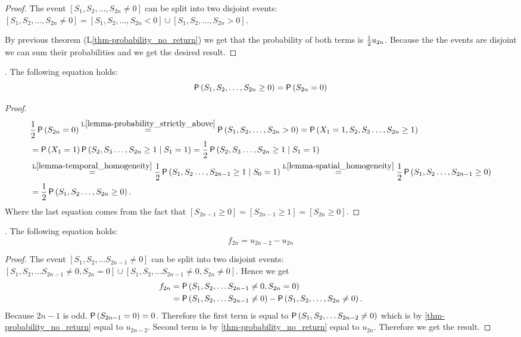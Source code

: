 \begin{proof}
 The event $[S_1, S_2, \ldots, S_{2n}\neq 0]$ can be split into two disjoint events:
 $[S_1, S_2, \ldots, S_{2n}\neq 0]=[S_1, S_2, \ldots, S_{2n} < 0]\cup [S_1, S_2, \ldots, S_{2n} > 0]$.

 By previous theorem (L\ref{thm-probability_no_return}) we get that the probability
 of both terms is $\frac{1}{2} u_{2n}$.
 Because the the events are disjoint we can sum their probabilities and we get the desired result.
\end{proof}
\begin{lemma}\label{lemma-probability_above_or_on}
  \Lrws. The following equation holds:
 \[
 \operatorname{\mathsf{P}} \left( S_1, S_2, \ldots, S_{2n} \geq 0 \right)
 =\operatorname{\mathsf{P}} \left( S_{2n}=0 \right)
 \]
\end{lemma}
\begin{proof}
\[
  \begin{split}
    & \frac{1}{2} \operatorname{\mathsf{P}}\left(S_{2n}=0 \right)\overset{\text{L}\ref{lemma-probability_strictly_above}}{=}\operatorname{\mathsf{P}} \left( S_1, S_2, \ldots, S_{2n}>0 \right)
    =\operatorname{\mathsf{P}} \left( X_1=1, S_2, S_3 \ldots, S_{2n}\geq 1 \right)\\
    & = \operatorname{\mathsf{P}} \left(X_1=1 \right)\operatorname{\mathsf{P}} \left(S_2, S_3 \ldots, S_{2n}\geq 1 \;\middle\vert\; S_1=1\right)
    =\frac{1}{2} \operatorname{\mathsf{P}} \left( S_2, S_3 \ldots, S_{2n}\geq 1 \mid S_1=1 \right)\\
    & \overset{\text{L}\ref{lemma-temporal_homogeneity}}{=}\frac{1}{2} \operatorname{\mathsf{P}} \left( S_1, S_2 \ldots, S_{2n-1}\geq 1 \mid S_0=1 \right)
    \overset{\text{L}\ref{lemma-spatial_homogeneity}}{=}\frac{1}{2} \operatorname{\mathsf{P}} \left( S_1, S_2 \ldots, S_{2n-1}\geq 0 \right)\\
    & =\frac{1}{2} \operatorname{\mathsf{P}} \left( S_1, S_2 \ldots, S_{2n}\geq 0 \right).
  \end{split}
 \]
 Where the last equation comes from the fact that $[S_{2n-1}\geq 0]=[S_{2n-1}\geq 1]=[S_{2n}\geq 0].$
\end{proof}
\begin{thm}\label{thm-f_2n}
  \Lrws. The following equation holds:
 \[
 f_{2n}=u_{2n-2}-u_{2n}
 \]
\end{thm}
\begin{proof}
 The event $[S_1, S_2, \ldots S_{2n-1}\neq 0]$ can be split into two disjoint events:
 $[S_1, S_2, \ldots S_{2n-1}\neq 0, S_{2n}=0] \cup [S_1, S_2, \ldots S_{2n-1}\neq 0, S_{2n}\neq 0]$.
 Hence we get
\[
  \begin{split}
    f_{2n} & =\operatorname{\mathsf{P}} \left( S_1, S_2, \ldots S_{2n-1}\neq 0, S_{2n}=0 \right)\\
    & =\operatorname{\mathsf{P}} \left( S_1, S_2, \ldots S_{2n-1}\neq 0 \right) -\operatorname{\mathsf{P}} \left( S_1, S_2, \ldots, S_{2n}\neq 0 \right).
  \end{split}
 \]
 Because $2n-1$ is odd. $\operatorname{\mathsf{P}} \left( S_{2n-1}=0 \right) =0$.
 Therefore the first term is equal to $\operatorname{\mathsf{P}} \left( S_1, S_2, \ldots S_{2n-2}\neq 0 \right)$
 which is by \ref{thm-probability_no_return} equal to $u_{2n-2}$. Second term is by \ref{thm-probability_no_return} equal to $u_{2n}$. Therefore we get the result.
\end{proof}

